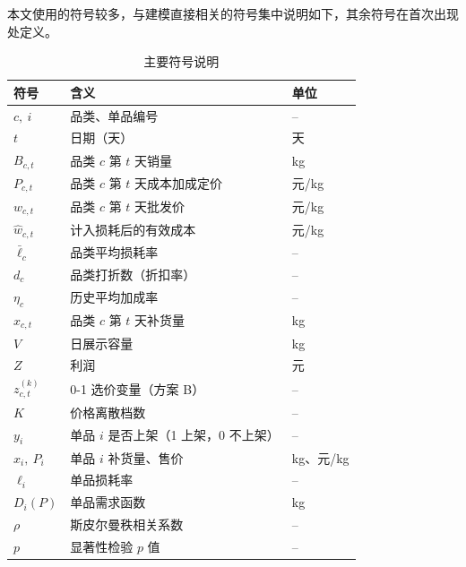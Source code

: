
本文使用的符号较多，与建模直接相关的符号集中说明如下，其余符号在首次出现处定义。

\begin{table}[H]
\centering
\caption{主要符号说明}
\label{tab:symbol}
\begin{tabular}{lll}
\toprule
符号 & 含义 & 单位 \\
\midrule
$c,\ i$ & 品类、单品编号 & -- \\
$t$ & 日期（天） & 天 \\
$B_{c,t}$ & 品类 $c$ 第 $t$ 天销量 & kg \\
$P_{c,t}$ & 品类 $c$ 第 $t$ 天成本加成定价 & 元/kg \\
$w_{c,t}$ & 品类 $c$ 第 $t$ 天批发价 & 元/kg \\
$\hat w_{c,t}$ & 计入损耗后的有效成本 & 元/kg \\
$\bar\ell_c$ & 品类平均损耗率 & -- \\
$d_c$ & 品类打折数（折扣率） & -- \\
$\eta_c$ & 历史平均加成率 & -- \\
$x_{c,t}$ & 品类 $c$ 第 $t$ 天补货量 & kg \\
$V$ & 日展示容量 & kg \\
$Z$ & 利润 & 元 \\
$z_{c,t}^{(k)}$ & 0-1 选价变量（方案 B） & -- \\
$K$ & 价格离散档数 & -- \\
$y_i$ & 单品 $i$ 是否上架（1 上架，0 不上架） & -- \\
$x_i,\ P_i$ & 单品 $i$ 补货量、售价 & kg、元/kg \\
$\ell_i$ & 单品损耗率 & -- \\
$D_i(P)$ & 单品需求函数 & kg \\
$\rho$ & 斯皮尔曼秩相关系数 & -- \\
$p$ & 显著性检验 $p$ 值 & -- \\
\bottomrule
\end{tabular}
\end{table}

